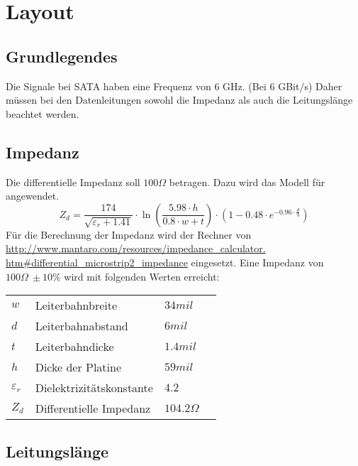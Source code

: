 
\section{Layout}

\subsection{Grundlegendes}
Die Signale bei SATA haben eine Frequenz von 6 GHz. (Bei 6 GBit/s)
Daher müssen bei den Datenleitungen sowohl die Impedanz als auch die 
Leitungslänge beachtet werden. 

\subsection{Impedanz}
Die differentielle Impedanz soll $100 \Omega$ betragen. Dazu wird das Modell 
für  angewendet. 
\[ Z_d = \frac{174}{\sqrt{\varepsilon_r + 1.41}} \cdot 
\ln \left(\frac{5.98 \cdot h}{0.8 \cdot w + t}\right) \cdot 
\left(1 - 0.48 \cdot e^{-0.96 \cdot \frac{d}{h}}\right) \]
Für die Berechnung der Impedanz wird der Rechner von 
\url{http://www.mantaro.com/resources/impedance_calculator.
htm#differential_microstrip2_impedance} 
eingesetzt. 
Eine Impedanz von $100 \Omega~\pm 10 \%$ wird mit folgenden Werten erreicht: 
\begin{tabular}{@{}llll}
$w$             & Leiterbahnbreite          &   $34 mil$        \\
$d$             & Leiterbahnabstand         &   $6 mil$         \\
$t$             & Leiterbahndicke           &   $1.4 mil$       \\
$h$             & Dicke der Platine         &   $59 mil$        \\
$\varepsilon_r$ & Dielektrizitätskonstante  &   $4.2$           \\
$Z_d$           & Differentielle Impedanz   &   $104.2 \Omega$  
\end{tabular}

\subsection{Leitungslänge}

